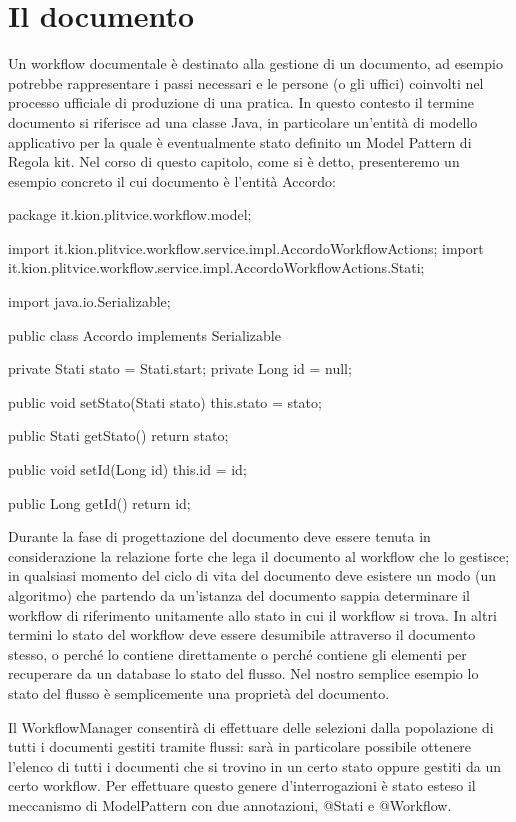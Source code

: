 \section{Il documento}
Un workflow documentale è destinato alla gestione di un documento, ad esempio potrebbe rappresentare i passi necessari e le persone (o gli uffici) coinvolti nel processo ufficiale di produzione di una pratica. 
In questo contesto il termine documento si riferisce ad  una classe Java, in particolare  un'entità di modello applicativo per la quale è eventualmente stato definito un  Model Pattern di Regola kit. Nel corso di questo capitolo, come si è detto, presenteremo un esempio concreto il cui documento è  l'entità Accordo:

\begin{java}
package it.kion.plitvice.workflow.model;

import it.kion.plitvice.workflow.service.impl.AccordoWorkflowActions;
import it.kion.plitvice.workflow.service.impl.AccordoWorkflowActions.Stati;

import java.io.Serializable;

public class Accordo implements Serializable {

  private Stati stato = Stati.start;
  private Long id = null;
  
  public void setStato(Stati stato) {
    this.stato = stato;
  }

  public Stati getStato() {
    return stato;
  }

  public void setId(Long id) {
    this.id = id;
  }

  public Long getId() {
    return id;
  }
  
}
\end{java}

Durante la fase di progettazione del documento deve essere tenuta in considerazione la relazione forte che lega  il documento al workflow che lo gestisce; in qualsiasi momento del ciclo di vita del documento deve esistere un modo (un algoritmo)  che partendo da un'istanza del documento sappia determinare il workflow di riferimento unitamente allo stato in cui il workflow si trova.  In altri termini lo stato del workflow deve essere desumibile attraverso il documento stesso, o perché lo contiene direttamente  o perché contiene gli elementi per recuperare da un database lo stato del flusso. 
Nel nostro semplice esempio lo stato del flusso è semplicemente una proprietà del documento.

Il WorkflowManager consentirà di effettuare delle selezioni dalla popolazione di tutti i documenti gestiti tramite flussi: sarà in particolare possibile ottenere l'elenco di tutti i documenti che si trovino in un certo stato oppure gestiti da un certo workflow. Per effettuare questo genere d'interrogazioni è stato esteso il meccanismo di ModelPattern con due annotazioni, @Stati e @Workflow.

